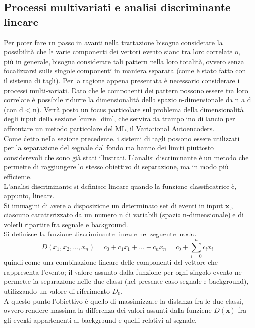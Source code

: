 \newpage

\subsection{Processi multivariati e analisi discriminante lineare}
\label{metodi lineari e discriminante di Fisher}

Per poter fare un passo in avanti nella trattazione bisogna considerare la possibilità che le varie componenti dei vettori evento siano tra loro correlate o, più in generale, bisogna considerare tali pattern nella loro totalità, ovvero senza focalizzarsi sulle singole componenti in maniera separata (come è stato fatto con il sistema di tagli).  Per la ragione appena presentata è necessario considerare i processi multi-variati.	Dato che le componenti dei pattern possono essere tra loro correlate è possibile ridurre la dimensionalità dello spazio n-dimensionale da n a d (con d < n). Verrà posto un focus particolare sul problema della dimensionalità degli input della sezione \ref{curse_dim}, che servirà da trampolino di lancio per affrontare un metodo particolare del ML, il Variational Autoencoders. \\
Come detto nella sezione precedente, i sistemi di tagli possono essere utilizzati per la separazione del segnale dal fondo ma hanno dei limiti piuttosto considerevoli che sono già stati illustrati. L'analisi discriminante è un metodo che permette di raggiungere lo stesso obiettivo di separazione, ma in modo più efficiente. \\
L'analisi discriminante si definisce lineare quando la funzione classificatrice è, appunto, lineare. \\
Si immagini di avere a disposizione un determinato set di eventi in input $\textbf{x}_\textbf{i}$, ciascuno caratterizzato da un numero n di variabili (spazio n-dimensionale) e di volerli ripartire fra segnale e background.\\
Si definisce la funzione discriminante lineare nel seguente modo:
\begin{equation}
D(x_1 , x_2 , ... , x_n) = c_0 + c_1x_1 + ... +c_nx_n = c_0 + \sum_{i=0}^{n} c_ix_i 
\end{equation}
quindi come una combinazione lineare delle componenti del vettore che rappresenta l'evento; il valore assunto dalla funzione per ogni singolo evento ne permette la separazione nelle due classi (nel presente caso segnale e background), utilizzando un valore di riferimento $D_0$. \\
A questo punto l'obiettivo è quello di massimizzare la distanza fra le due classi, ovvero rendere massima la differenza dei valori assunti dalla funzione $D(\textbf{x})$ fra gli eventi appartenenti al background e quelli relativi al segnale. \\
